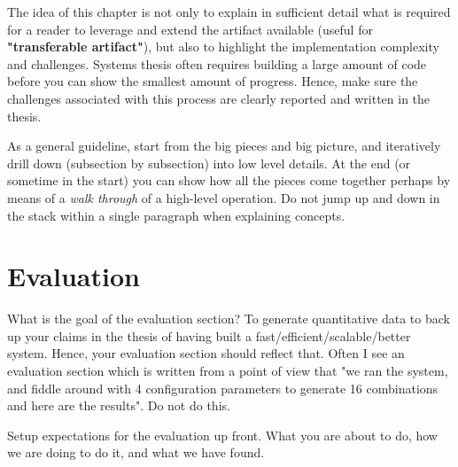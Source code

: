 \documentclass[11pt]{article}
\begin{document}
The idea of this chapter is not only to explain in sufficient detail what is required for a reader to leverage and extend the artifact available (useful for \textbf{"transferable artifact"}), but also to highlight the implementation complexity and challenges. Systems thesis often requires building a large amount of code before you can show the smallest amount of progress. Hence, make sure the challenges associated with this process are clearly reported and written in the thesis. 


As a general guideline, start from the big pieces and big picture, and iteratively drill down (subsection by subsection) into low level details. At the end (or sometime in the start) you can show how all the pieces come together perhaps by means of a \textit{walk through} of a high-level operation. Do not jump up and down in the stack within a single paragraph when explaining concepts. 

\newpage 
\section{Evaluation}
What is the goal of the evaluation section? To generate quantitative data to back up your claims in the thesis of having built a fast/efficient/scalable/better system. Hence, your evaluation section should reflect that. Often I see an evaluation section which is written from a point of view that "we ran the system, and fiddle around with 4 configuration parameters to generate 16 combinations and here are the results". Do not do this. 

Setup expectations for the evaluation up front. What you are about to do, how we are doing to do it, and what we have found. 
\end{document}
